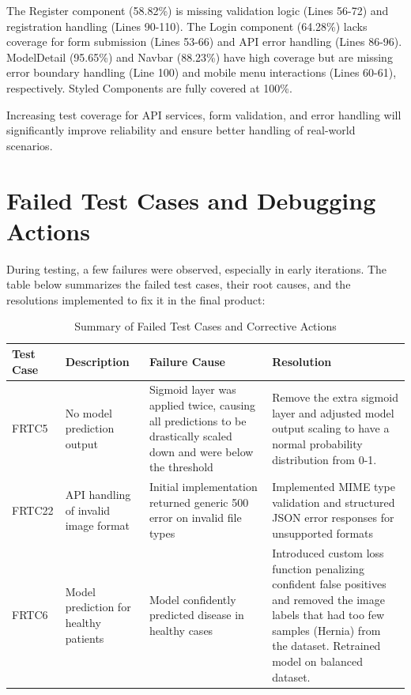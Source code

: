\documentclass[12pt, titlepage]{article}
\begin{document}
The Register component (58.82\%) is missing validation logic (Lines 56-72) and registration handling (Lines 90-110). The Login component (64.28\%) lacks coverage for form submission (Lines 53-66) and API error handling (Lines 86-96). ModelDetail (95.65\%) and Navbar (88.23\%) have high coverage but are missing error boundary handling (Line 100) and mobile menu interactions (Lines 60-61), respectively. Styled Components are fully covered at 100\%.

Increasing test coverage for API services, form validation, and error handling will significantly improve reliability and ensure better handling of real-world scenarios.





\newpage{}


\section{Failed Test Cases and Debugging Actions}
During testing, a few failures were observed, especially in early iterations. The table below summarizes the failed test cases, their root causes, and the resolutions implemented to fix it in the final product:

\begin{table}[h!]
\centering
\begin{tabular}{|p{2cm}|p{3cm}|p{4cm}|p{4.5cm}|}
\hline
\textbf{Test Case} & \textbf{Description} & \textbf{Failure Cause} & \textbf{Resolution} \\
\hline
FRTC5 & No model prediction output & Sigmoid layer was applied twice, causing all predictions to be drastically scaled down and were below the threshold & Remove the extra sigmoid layer and adjusted model output scaling to have a normal probability distribution from 0-1. \\
\hline
FRTC22 & API handling of invalid image format & Initial implementation returned generic 500 error on invalid file types & Implemented MIME type validation and structured JSON error responses for unsupported formats \\
\hline
FRTC6 & Model prediction for healthy patients & Model confidently predicted disease in healthy cases & Introduced custom loss function penalizing confident false positives and removed the image labels that had too few samples (Hernia) from the dataset. Retrained model on balanced dataset. \\
\hline
\end{tabular}
\caption{Summary of Failed Test Cases and Corrective Actions}
\label{tab:failed-tests}
\end{table}
\end{document}
